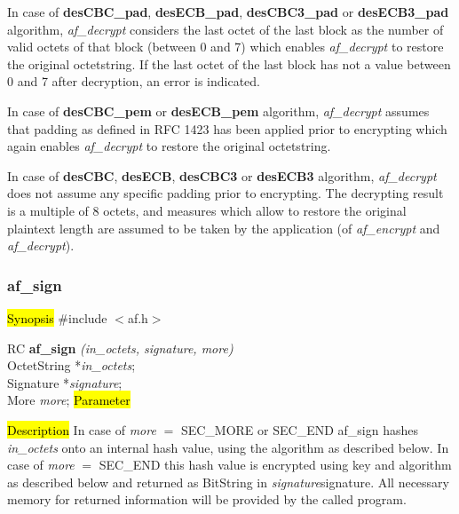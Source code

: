    In case of {\bf desCBC\_pad}, {\bf desECB\_pad}, {\bf desCBC3\_pad} or 
   {\bf desECB3\_pad} algorithm, {\em af\_decrypt} considers 
   the last octet of the last block as the number of 
   valid octets of that block (between 0 and 7) which enables {\em af\_decrypt}
   to restore the original octetstring. If the last octet of the last block has not
   a value between 0 and 7 after decryption, an error is indicated.

   In case of {\bf desCBC\_pem} or {\bf desECB\_pem} algorithm, {\em af\_decrypt} assumes
   that padding as defined in RFC 1423 has been applied prior to encrypting
   which again enables {\em af\_decrypt}
   to restore the original octetstring.

   In case of {\bf desCBC}, {\bf desECB}, {\bf desCBC3} or {\bf desECB3} algorithm, {\em af\_decrypt} does
   not assume any specific padding prior to encrypting. The decrypting result is a multiple
   of 8 octets, and measures which allow to restore the original plaintext length are 
   assumed to be taken by the application (of {\em af\_encrypt} and {\em af\_decrypt}).

\subsubsection{af\_sign}
\label{af_sign}
\hl{Synopsis}
\#include $<$af.h$>$

RC {\bf af\_sign} {\em (in\_octets, signature, more)} \\
OctetString *{\em in\_octets}; \\
Signature *{\em signature}; \\
More {\em more};
\hl{Parameter}



\hl{Description}
In case of {\em more} $=$ SEC\_MORE or SEC\_END af\_sign hashes {\em in\_octets} onto
an internal hash value, using the algorithm as described below.
In case of {\em more} $=$ SEC\_END this hash value is encrypted using key and
algorithm as described below and returned as BitString in {\em signature}\pf signature.
All necessary memory for returned information will be provided by the
called program.

